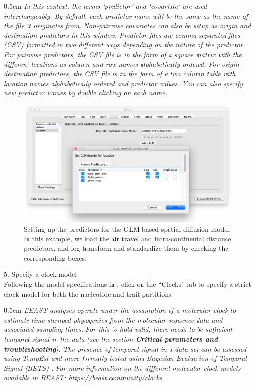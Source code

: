 \documentclass{article}
\newcommand{\ann}[1]{
\begin{adjustwidth}{0.5cm}{}
\it{#1}\\
\end{adjustwidth}}
\newcommand{\code}[1]{
{\upshape\ttfamily{#1}}}
\begin{document}
\ann{In this context, the terms `predictor' and `covariate' are used interchangeably.  
By default, each predictor name will be the same as the name of the file it originates from. Non-pairwise covariates can also be setup as origin and destination predictors in this window. Predictor files are comma-separated files (CSV) formatted in two different ways depending on the nature of the predictor. For pairwise predictors, the CSV file is in the form of a square matrix with the different locations as column and row names alphabetically ordered. For origin-destination predictors, the CSV file is in the form of a two column table with location names alphabetically ordered and predictor values. %
You can also specify new predictor names by double clicking on each name.
}

\begin{figure}[!ht]
    \centering
    \includegraphics[width=1.0\textwidth]{figs/GLM.pdf}
    \caption{Setting up the predictors for the GLM-based spatial diffusion model. In this example, we load the air travel and intra-continental distance predictors, and log-transform and standardize them by checking the corresponding boxes.}
    \label{fig:GLM}
\end{figure}

5. Specify a clock model\\

Following the model specifications in \cite{travhist}, %
click on the ``Clocks" tab to specify a strict clock model for both the nucleotide and trait partitions.\\
\ann{BEAST analyses operate under the assumption of a molecular clock to estimate time-stamped phylogenies from the molecular sequence data and associated sampling times.
For this to hold valid, there needs to be sufficient temporal signal in the data (see the section \textbf{Critical parameters and troubleshooting}).
The presence of temporal signal in a data set can be assessed using TempEst \cite{tempest} and more formally tested using Bayesian Evaluation of Temporal Signal (BETS) \cite{bets}. %
For more information on the different molecular clock models available in BEAST: {\upshape\url{https://beast.community/clocks}}} %
\end{document}
